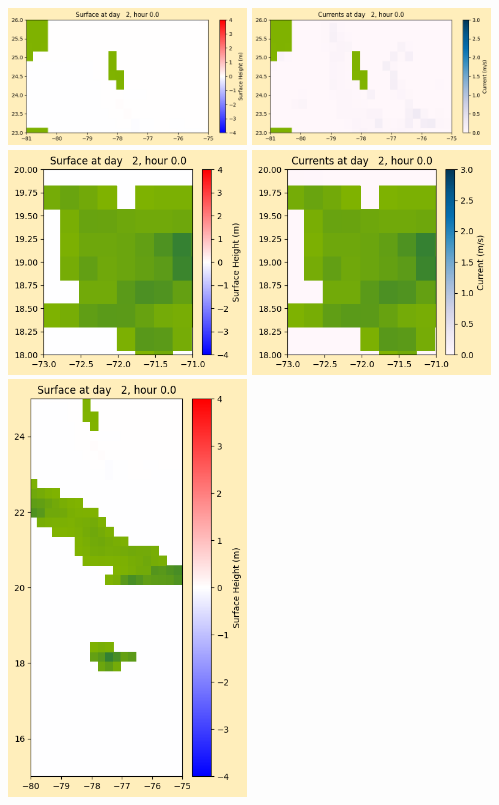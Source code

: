 \documentclass[11pt]{article}
\begin{document}
\vskip 10pt 
\includegraphics[width=0.475\textwidth]{frame0020fig1003.png}
\includegraphics[width=0.475\textwidth]{frame0020fig1004.png}
\vskip 10pt 
\includegraphics[width=0.475\textwidth]{frame0020fig1005.png}
\includegraphics[width=0.475\textwidth]{frame0020fig1006.png}
\vskip 10pt 
\includegraphics[width=0.475\textwidth]{frame0020fig1007.png}
\end{document}
